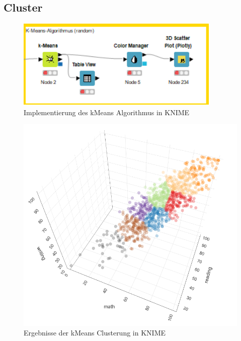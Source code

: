 \documentclass[
	handout,
  	aspectratio=169
]{beamer}
\begin{document}
	\subsection{Cluster}
	\begin{frame}
	\begin{center}					
					\begin{figure}[h]
						\includegraphics[scale=1]{../pictures/kmeans.png}
						\caption{Implementierung des kMeans Algorithmus in KNIME}		
					\end{figure}	
				\end{center}	
	\end{frame}
	
	\begin{frame}
	\begin{center}					
					\begin{figure}[h]
						\includegraphics[scale=0.5]{../pictures/cluster.png}
						\caption{Ergebnisse der kMeans Clusterung in KNIME}		
					\end{figure}	
				\end{center}	
	\end{frame}
\end{document}
